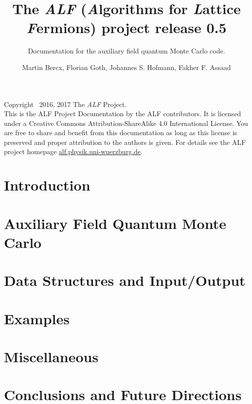 \documentclass[10pt,Arial]{scrartcl}
\begin{document}
\title{The \emph{ALF} (\emph{A}lgorithms for \emph{L}attice \emph{F}ermions) project release 0.5}

\subtitle{Documentation for the  auxiliary field quantum Monte Carlo  code.}
\author{Martin Bercx,  Florian Goth,  Johannes S. Hofmann, Fakher F. Assaad }
\maketitle

Copyright \textcopyright ~2016, 2017 The \textit{ALF} Project.\\
This is the ALF Project Documentation by the ALF contributors.
It is licensed under a Creative Commons Attribution-ShareAlike 4.0 International License.
You are free to share and benefit from this documentation as long as this license is preserved
and proper attribution to the authors is given. For details see the ALF project
homepage \url{alf.physik.uni-wuerzburg.de}.
\tableofcontents
\clearpage
\section{Introduction}\label{sec:intro}

\section{Auxiliary Field Quantum Monte Carlo}\label{sec:def}





\section{Data Structures and Input/Output}\label{sec:imp}




\section{Examples}\label{sec:ex}

\section{Miscellaneous}\label{sec:misc}




\section{Conclusions and Future Directions}\label{sec:con}


 


\end{document}
